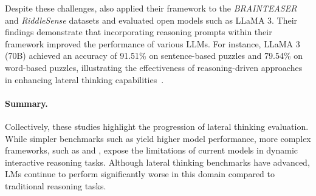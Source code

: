 Despite these challenges, \textcite{chenWeakevalStrongEvaluatingEliciting2024} also applied their framework to the \textit{BRAINTEASER} and \textit{RiddleSense} datasets and evaluated open models such as \ac{LLaMA} 3. Their findings demonstrate that incorporating reasoning prompts within their framework improved the performance of various \acp{LLM}. For instance, \ac{LLaMA} 3 (70B) achieved an accuracy of 91.51\% on sentence-based puzzles and 79.54\% on word-based puzzles, illustrating the effectiveness of reasoning-driven approaches in enhancing lateral thinking capabilities~\cite{chenWeakevalStrongEvaluatingEliciting2024}.

\paragraph{Summary.} Collectively, these studies highlight the progression of lateral thinking evaluation. While simpler benchmarks such as \textcite{jiangBRAINTEASERLateralThinking2023} yield higher model performance, more complex frameworks, such as \textcite{huangLatEvalInteractiveLLMs2024} and \textcite{chenWeakevalStrongEvaluatingEliciting2024}, expose the limitations of current models in dynamic interactive reasoning tasks. Although lateral thinking benchmarks have advanced, \acp{LM} continue to perform significantly worse in this domain compared to traditional reasoning tasks.
